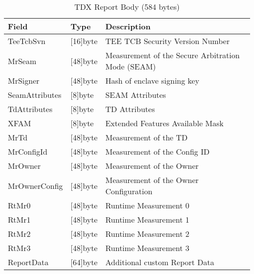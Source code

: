 \begin{table}[h]
	\begin{tabularx}{\textwidth}{|l|l|X|}
		\hline
		\textbf{Field}         & \textbf{Type}         & \textbf{Description} \\ \hline
		TeeTcbSvn              & {[}16{]}byte          & TEE TCB Security Version Number \\ \hline
		MrSeam                 & {[}48{]}byte          & Measurement of the Secure Arbitration Mode (SEAM) \\ \hline
		MrSigner               & {[}48{]}byte          & Hash of enclave signing key \\ \hline
		SeamAttributes         & {[}8{]}byte           & SEAM Attributes \\ \hline
		TdAttributes           & {[}8{]}byte           & TD Attributes \\ \hline
		XFAM                   & {[}8{]}byte           & Extended Features Available Mask\\ \hline
		MrTd                   & {[}48{]}byte          & Measurement of the TD \\ \hline
		MrConfigId             & {[}48{]}byte          & Measurement of the Config ID \\ \hline
		MrOwner                & {[}48{]}byte          & Measurement of the Owner \\ \hline
		MrOwnerConfig          & {[}48{]}byte          & Measurement of the Owner Configuration \\ \hline
		RtMr0                  & {[}48{]}byte          & Runtime Measurement 0 \\ \hline
		RtMr1                  & {[}48{]}byte          & Runtime Measurement 1 \\ \hline
		RtMr2                  & {[}48{]}byte          & Runtime Measurement 2 \\ \hline
		RtMr3                  & {[}48{]}byte          & Runtime Measurement 3 \\ \hline
		ReportData             & {[}64{]}byte          & Additional custom Report Data \\ \hline
	\end{tabularx}
	\centering
	\caption{TDX Report Body (584 bytes)  \cite{dcap_library_code}}
	\label{tdx-report-body-table}
\end{table}
